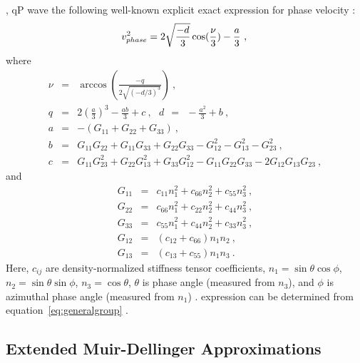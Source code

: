 , qP wave  the following well-known explicit exact expression for phase velocity  \cite[]{helbig,tsvankinortho,tsvankinbook}:
\begin{equation}
\label{eq:orthoexactphase}
v^2_{phase} = 2\sqrt{\frac{-d}{3}}\cos(\frac{\nu}{3})-\frac{a}{3} ~,\\
\end{equation}
where
\begin{eqnarray}
\nonumber
\nu & = & \arccos \left(\frac{-q}{2\sqrt{(-d/3)^3}}\right)~,\\
\nonumber
q & = & 2\left(\frac{a}{3}\right)^3 - \frac{ab}{3}+c~,~~~d~~=~~-\frac{a^2}{3} + b~,\\
\nonumber
a & = & -(G_{11}+G_{22}+G_{33})~,\\
\nonumber
b & = & G_{11}G_{22}+G_{11}G_{33}+G_{22}G_{33}-G^2_{12}-G^2_{13}-G^2_{23}~,\\
\nonumber
c & = & G_{11}G^2_{23}+G_{22}G^2_{13}+G_{33}G^2_{12}-G_{11}G_{22}G_{33}-2G_{12}G_{13}G_{23}~,
\end{eqnarray}
and
\begin{eqnarray}
\nonumber
G_{11} & = & c_{11}n^2_1 + c_{66}n^2_2 + c_{55}n^2_3~,\\
\nonumber
G_{22} & = & c_{66}n^2_1 + c_{22}n^2_2 + c_{44}n^2_3~,\\
\nonumber
G_{33} & = & c_{55}n^2_1 + c_{44}n^2_2 + c_{33}n^2_3~,\\
\nonumber
G_{12} & = & (c_{12}+c_{66})n_1n_2~,\\
\nonumber
G_{13} & = & (c_{13}+c_{55})n_1n_3~.
\end{eqnarray}
Here, $c_{ij}$ are density-normalized stiffness tensor coefficients, $n_1 = \sin\theta \cos\phi$, $n_2 = \sin\theta \sin\phi$, $n_3 = \cos\theta$, $\theta$ is  phase angle (measured from $n_3$), and  $\phi$ is azimuthal phase angle (measured from $n_1$) .  expression can be determined from equation~\ref{eq:generalgroup} .


\subsection{Extended Muir-Dellinger Approximations}

